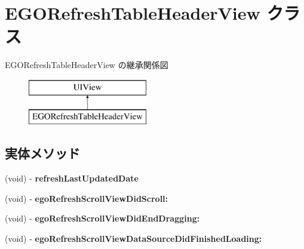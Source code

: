 \hypertarget{interface_e_g_o_refresh_table_header_view}{}\section{E\+G\+O\+Refresh\+Table\+Header\+View クラス}
\label{interface_e_g_o_refresh_table_header_view}
E\+G\+O\+Refresh\+Table\+Header\+View の継承関係図\begin{figure}[H]
\begin{center}
\leavevmode
\includegraphics[height=2.000000cm]{interface_e_g_o_refresh_table_header_view}
\end{center}
\end{figure}
\subsection*{実体メソッド}
\begin{DoxyCompactItemize}
\item 
\hypertarget{interface_e_g_o_refresh_table_header_view_a194cd65e46e4f0e1a87eed587ecbd5ce}{}(void) -\/ {\bfseries refresh\+Last\+Updated\+Date}\label{interface_e_g_o_refresh_table_header_view_a194cd65e46e4f0e1a87eed587ecbd5ce}

\item 
\hypertarget{interface_e_g_o_refresh_table_header_view_a8e555a74ee13195926251f84795e4e23}{}(void) -\/ {\bfseries ego\+Refresh\+Scroll\+View\+Did\+Scroll\+:}\label{interface_e_g_o_refresh_table_header_view_a8e555a74ee13195926251f84795e4e23}

\item 
\hypertarget{interface_e_g_o_refresh_table_header_view_a0f4a7b4d3a63a9d15156ce37295f8865}{}(void) -\/ {\bfseries ego\+Refresh\+Scroll\+View\+Did\+End\+Dragging\+:}\label{interface_e_g_o_refresh_table_header_view_a0f4a7b4d3a63a9d15156ce37295f8865}

\item 
\hypertarget{interface_e_g_o_refresh_table_header_view_a368b0e8d966a4b8613925ffce1b9eb8e}{}(void) -\/ {\bfseries ego\+Refresh\+Scroll\+View\+Data\+Source\+Did\+Finished\+Loading\+:}\label{interface_e_g_o_refresh_table_header_view_a368b0e8d966a4b8613925ffce1b9eb8e}

\end{DoxyCompactItemize}
